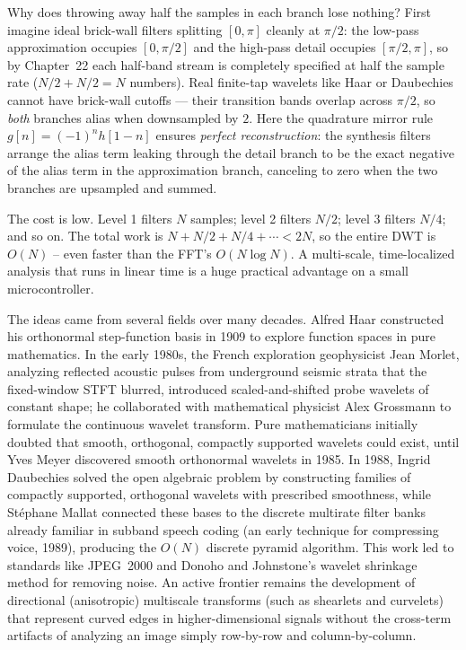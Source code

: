 \begin{whybox}
Why does throwing away half the samples in each branch lose nothing? First imagine ideal brick-wall filters splitting $[0,\pi]$ cleanly at $\pi/2$: the low-pass approximation occupies $[0,\pi/2]$ and the high-pass detail occupies $[\pi/2,\pi]$, so by Chapter~22 each half-band stream is completely specified at half the sample rate ($N/2 + N/2 = N$ numbers). Real finite-tap wavelets like Haar or Daubechies cannot have brick-wall cutoffs --- their transition bands overlap across $\pi/2$, so \emph{both} branches alias when downsampled by $2$. Here the quadrature mirror rule $g[n] = (-1)^n h[1-n]$ ensures \emph{perfect reconstruction}: the synthesis filters arrange the alias term leaking through the detail branch to be the exact negative of the alias term in the approximation branch, canceling to zero when the two branches are upsampled and summed.
\end{whybox}

The cost is low. Level 1 filters $N$ samples; level 2 filters $N/2$; level
3 filters $N/4$; and so on. The total work is $N + N/2 + N/4 + \cdots < 2N$, so
the entire DWT is \textbf{$O(N)$} -- even faster than the FFT's $O(N\log N)$. A
multi-scale, time-localized analysis that runs in linear time is a huge practical
advantage on a small microcontroller.

\begin{historybox}
The ideas came from several fields over many decades. Alfred Haar constructed his
orthonormal step-function basis in 1909 to explore function spaces in pure mathematics.
In the early 1980s, the French exploration geophysicist Jean Morlet, analyzing reflected
acoustic pulses from underground seismic strata that the fixed-window STFT blurred,
introduced scaled-and-shifted probe wavelets of constant shape; he collaborated with
mathematical physicist Alex Grossmann to formulate the continuous wavelet transform.
Pure mathematicians initially doubted that smooth, orthogonal, compactly supported
wavelets could exist, until Yves Meyer discovered smooth orthonormal wavelets in 1985.
In 1988, Ingrid Daubechies solved the open algebraic problem by constructing families of
compactly supported, orthogonal wavelets with prescribed smoothness, while St\'ephane
Mallat connected these bases to the discrete multirate filter banks already familiar
in subband speech coding (an early technique for compressing voice, 1989), producing the $O(N)$ discrete pyramid algorithm.
This work led to standards like JPEG~2000 and Donoho and Johnstone's wavelet shrinkage method for removing noise. An active frontier remains the development of directional (anisotropic) multiscale transforms (such as shearlets and curvelets) that represent curved edges in
higher-dimensional signals without the cross-term artifacts of analyzing an image simply row-by-row and column-by-column.
\end{historybox}

